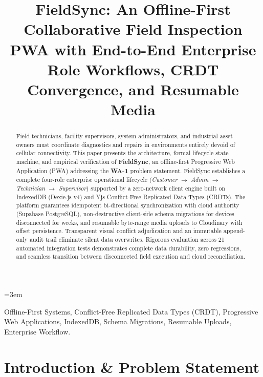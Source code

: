 \documentclass[conference]{IEEEtran}
\begin{document}
\hfuzz=10pt
\sloppy
\emergencystretch=3em

\title{\LARGE\bfseries FieldSync: An Offline-First Collaborative Field Inspection PWA with End-to-End Enterprise Role Workflows, CRDT Convergence, and Resumable Media}

\author{
}

\maketitle

\begin{abstract}
Field technicians, facility supervisors, system administrators, and industrial asset owners must coordinate diagnostics and repairs in environments entirely devoid of cellular connectivity. This paper presents the architecture, formal lifecycle state machine, and empirical verification of \textbf{FieldSync}, an offline-first Progressive Web Application (PWA) addressing the \textbf{WA-1} problem statement. FieldSync establishes a complete four-role enterprise operational lifecycle (\textit{Customer} $\rightarrow$ \textit{Admin} $\rightarrow$ \textit{Technician} $\rightarrow$ \textit{Supervisor}) supported by a zero-network client engine built on IndexedDB (Dexie.js v4) and Yjs Conflict-Free Replicated Data Types (CRDTs). The platform guarantees idempotent bi-directional synchronization with cloud authority (Supabase PostgreSQL), non-destructive client-side schema migrations for devices disconnected for weeks, and resumable byte-range media uploads to Cloudinary with offset persistence. Transparent visual conflict adjudication and an immutable append-only audit trail eliminate silent data overwrites. Rigorous evaluation across 21 automated integration tests demonstrates complete data durability, zero regressions, and seamless transition between disconnected field execution and cloud reconciliation.
\end{abstract}

\begin{IEEEkeywords}
Offline-First Systems, Conflict-Free Replicated Data Types (CRDT), Progressive Web Applications, IndexedDB, Schema Migrations, Resumable Uploads, Enterprise Workflow.
\end{IEEEkeywords}

\section{Introduction \& Problem Statement}
\end{document}
